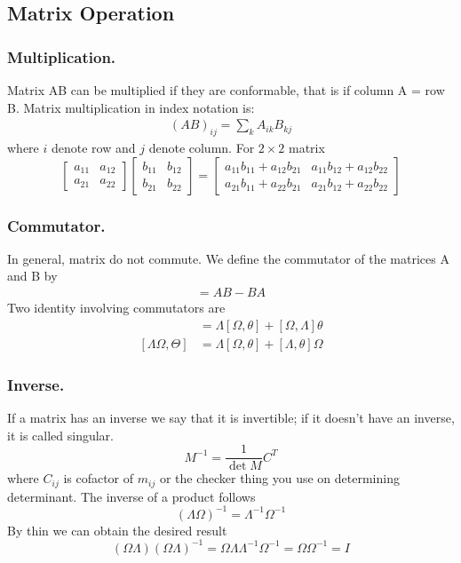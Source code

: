 \documentclass[../main.tex]{subfiles}
\begin{document}
\subsection{Matrix Operation}
\subsubsection{Multiplication.}
Matrix AB can be multiplied if they are conformable, that is if column A = row B.
Matrix multiplication in index notation is:
\begin{align*}
	(AB)_{ij}=\sum_{k}A_{ik}B_{kj}
\end{align*}
where $i$ denote row and $j$ denote column.
For $2\times2$ matrix
\begin{equation*}
	\begin{bmatrix}
		a_{11} & a_{12} \\
		a_{21} & a_{22}
	\end{bmatrix}
	\begin{bmatrix}
		b_{11} & b_{12} \\
		b_{21} & b_{22}
	\end{bmatrix}=
	\begin{bmatrix}
		a_{11}b_{11} + a_{12}b_{21} & a_{11}b_{12} + a_{12}b_{22} \\
		a_{21}b_{11} + a_{22}b_{21} & a_{21}b_{12} + a_{22}b_{22}
	\end{bmatrix}
\end{equation*}

\subsubsection{Commutator.}
In general, matrix do not commute. We define the commutator of the matrices A and B by
\begin{align*}
	[A, B] = AB - BA
\end{align*}
Two identity involving commutators are
\begin{align*}
	[\Omega,\Lambda\theta] & =\Lambda[\Omega,\theta]+[\Omega,\Lambda]\theta \\
	[\Lambda\Omega,\Theta] & =\Lambda[\Omega,\theta]+[\Lambda,\theta]\Omega
\end{align*}

\subsubsection{Inverse.}
If a matrix has an inverse we say that it is invertible; if it doesn't have an inverse, it is called singular.
\begin{equation*}
	M^{-1}=\frac{1}{\det M}C^{T}
\end{equation*}
where $C_{ij}$ is cofactor of $m_{ij}$ or the checker thing you use on determining determinant.
The inverse of a product follows
\begin{equation*}
	(\Lambda\Omega)^{-1}=\Lambda^{-1}\Omega^{-1}
\end{equation*}
By thin we can obtain the desired result
\begin{equation*}
	(\Omega\Lambda)(\Omega\Lambda)^{-1}=\Omega\Lambda\Lambda^{-1}\Omega^{-1}=\Omega\Omega^{-1}=I
\end{equation*}
\end{document}
